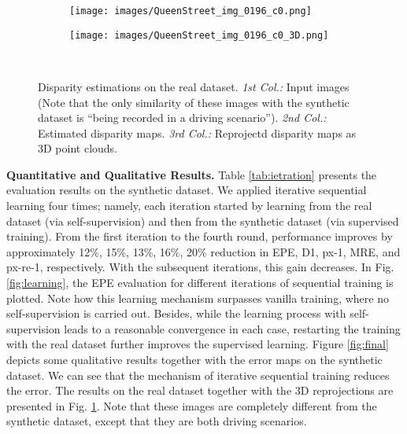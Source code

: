 \documentclass[10pt,twocolumn,letterpaper]{article}
\begin{document}
\begin{figure}[tbp]
\begin{subfigure}[c]{.325\linewidth}
		\texttt{[image: images/QueenStreet\_img\_0196\_c0.png]}
		\vspace*{-0.45cm}
	\end{subfigure}
	\begin{subfigure}[c]{.325\linewidth}
		\texttt{[image: images/QueenStreet\_img\_0196\_c0\_3D.png]}
		\vspace*{-0.45cm}
	\end{subfigure}
	\\\vspace{-0.3cm}
	\caption{Disparity estimations on the real dataset. \emph{1st Col.:} Input images (Note that the only similarity of these images with the synthetic dataset is \enquote{being recorded in a driving scenario}). \emph{2nd Col.:} Estimated disparity maps. \emph{3rd Col.:} Reprojectd disparity maps as 3D point clouds.}
	\label{fig:realDataset}
\end{figure} 
\noindent\textbf{Quantitative and Qualitative Results.} Table \ref{tab:ietration} presents the evaluation results on the synthetic dataset. We applied iterative sequential learning four times; namely, each iteration started by learning from the real dataset (via self-supervision) and then from the synthetic dataset (via supervised training). From the first iteration to the fourth round, performance improves by approximately 12\%, 15\%, 13\%, 16\%, 20\% reduction in EPE, D1, px-1, MRE, and px-re-1, respectively. With the subsequent iterations, this gain decreases. In Fig. \ref{fig:learning}, the EPE evaluation for different iterations of sequential training is plotted. Note how this learning mechanism surpasses vanilla training, where no self-supervision is carried out. Besides, while the learning process with self-supervision leads to a reasonable convergence in each case, restarting the training with the real dataset further improves the supervised learning. Figure \ref{fig:final} depicts some qualitative results together with the error maps on the synthetic dataset. We can see that the mechanism of iterative sequential training reduces the error. The results on the real dataset together with the 3D reprojections are presented in Fig. \ref{fig:realDataset}. Note that these images are completely different from the synthetic dataset, except that they are both driving scenarios.
\end{document}

